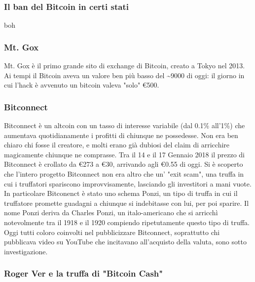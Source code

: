 \documentclass {article}
\begin{document}
\subsubsection {Il ban del Bitcoin in certi stati}


boh


\subsubsection {Mt. Gox}


Mt. Gox è il primo grande sito di exchange di Bitcoin, creato a Tokyo nel 2013.
Ai tempi il Bitcoin aveva un valore ben più basso del \textasciitilde 9000 di oggi: il giorno in cui l'hack è avvenuto un bitcoin valeva "solo" \euro{500}.


\subsubsection {Bitconnect}


Bitconnect è un altcoin con un tasso di interesse variabile (dal 0.1\% all'1\%) che aumentava quotidianamente i profitti di chiunque ne possedesse.
Non era ben chiaro chi fosse il creatore, e molti erano già dubiosi del claim di arricchire magicamente chiunque ne comprasse.
Tra il 14 e il 17 Gennaio 2018 il prezzo di Bitconnect è crollato da \euro{273} a \euro{30}, arrivando agli \euro{0.55} di oggi.
Si è scoperto che l'intero progetto Bitconnect non era altro che un' "exit scam", una truffa in cui i truffatori spariscono improvvisamente, lasciando gli investitori a mani vuote.
In particolare Bitconenct è stato uno schema Ponzi, un tipo di truffa in cui il truffatore promette guadagni a chiunque si indebitasse con lui, per poi sparire.
Il nome Ponzi deriva da Charles Ponzi, un italo-americano che si arricchì notevolmente tra il 1918 e il 1920 compiendo ripetutamente questo tipo di truffa.
Oggi tutti coloro coinvolti nel pubblicizzare Bitconnect, soprattutto chi pubblicava video su YouTube che incitavano all'acquisto della valuta, sono sotto investigazione.


\subsubsection {Roger Ver e la truffa di "Bitcoin Cash"}
\end{document}
